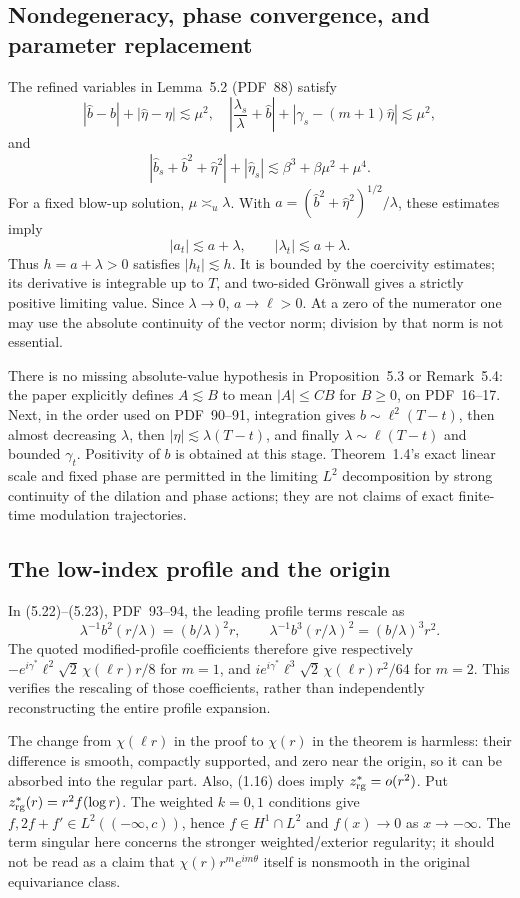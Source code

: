 \documentclass[10pt]{article}
\begin{document}
\subsection*{Nondegeneracy, phase convergence, and parameter replacement}
The refined variables in Lemma 5.2 (PDF 88) satisfy \[|\widehat b-b|+|\widehat\eta-\eta|\lesssim\mu^2,\quad
\left|\frac{\lambda_s}{\lambda}+\widehat b\right|
+|\gamma_s-(m+1)\widehat\eta|\lesssim\mu^2,\] and \[|\widehat b_s+\widehat b^2+\widehat\eta^2|
+|\widehat\eta_s|\lesssim\beta^3+\beta\mu^2+\mu^4.\] For a fixed blow-up solution, \(\mu\asymp_u\lambda\). With \(a=(\widehat b^2+\widehat\eta^2)^{1/2}/\lambda\), these estimates imply \[|a_t|\lesssim a+\lambda,\qquad
|\lambda_t|\lesssim a+\lambda.\] Thus \(h=a+\lambda>0\) satisfies \(|h_t|\lesssim h\). It is bounded by the coercivity estimates; its derivative is integrable up to \(T\), and two-sided Grönwall gives a strictly positive limiting value. Since \(\lambda\to0\), \(a\to\ell>0\). At a zero of the numerator one may use the absolute continuity of the vector norm; division by that norm is not essential.\par
There is no missing absolute-value hypothesis in Proposition 5.3 or Remark 5.4: the paper explicitly defines \(A\lesssim B\) to mean \(|A|\le CB\) for \(B\ge0\), on PDF 16–17. Next, in the order used on PDF 90–91, integration gives \(b\sim\ell^2(T-t)\), then almost decreasing \(\lambda\), then \(|\eta|\lesssim\lambda(T-t)\), and finally \(\lambda\sim\ell(T-t)\) and bounded \(\gamma_t\). Positivity of \(b\) is obtained at this stage. Theorem 1.4’s exact linear scale and fixed phase are permitted in the limiting \(L^2\) decomposition by strong continuity of the dilation and phase actions; they are not claims of exact finite-time modulation trajectories.\par
\subsection*{The low-index profile and the origin}
In (5.22)–(5.23), PDF 93–94, the leading profile terms rescale as \[\lambda^{-1}b^2(r/\lambda)=(b/\lambda)^2r,\qquad
\lambda^{-1}b^3(r/\lambda)^2=(b/\lambda)^3r^2 .\] The quoted modified-profile coefficients therefore give respectively \(-e^{i\gamma^*}\ell^2\sqrt2\,\chi(\ell r)r/8\) for \(m=1\), and \(ie^{i\gamma^*}\ell^3\sqrt2\,\chi(\ell r)r^2/64\) for \(m=2\). This verifies the rescaling of those coefficients, rather than independently reconstructing the entire profile expansion.\par
The change from \(\chi(\ell r)\) in the proof to \(\chi(r)\) in the theorem is harmless: their difference is smooth, compactly supported, and zero near the origin, so it can be absorbed into the regular part. Also, (1.16) does imply \(z_{\rm rg}^*=o(r^2)\). Put \(z_{\rm rg}^*(r)=r^2f(\log r)\). The weighted \(k=0,1\) conditions give \(f,2f+f'\in L^2((-\infty,c))\), hence \(f\in H^1\cap L^2\) and \(f(x)\to0\) as \(x\to-\infty\). The term singular here concerns the stronger weighted/exterior regularity; it should not be read as a claim that \(\chi(r)r^me^{im\theta}\) itself is nonsmooth in the original equivariance class.\par
\end{document}
